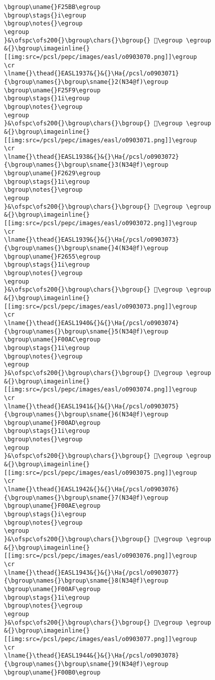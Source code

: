 \begin{verbatim}
\bgroup\uname{}F25BB\egroup
\bgroup\stags{}i\egroup
\bgroup\notes{}\egroup
\egroup
}&\ofspc\ofs200{}\bgroup\chars{}\bgroup{} 󲖻\egroup \egroup
&{}\bgroup\imageinline{}[[img:src=/pcsl/pepc/images/easl/o0903070.png]]\egroup
\cr
\lname{}\thead{}EASL1937&{}&{}\Ha{/pcsl/o0903071}{\bgroup\names{}\bgroup\sname{}2(N34@f)\egroup
\bgroup\uname{}F25F9\egroup
\bgroup\stags{}1i\egroup
\bgroup\notes{}\egroup
\egroup
}&\ofspc\ofs200{}\bgroup\chars{}\bgroup{} 󲗹\egroup \egroup
&{}\bgroup\imageinline{}[[img:src=/pcsl/pepc/images/easl/o0903071.png]]\egroup
\cr
\lname{}\thead{}EASL1938&{}&{}\Ha{/pcsl/o0903072}{\bgroup\names{}\bgroup\sname{}3(N34@f)\egroup
\bgroup\uname{}F2629\egroup
\bgroup\stags{}1i\egroup
\bgroup\notes{}\egroup
\egroup
}&\ofspc\ofs200{}\bgroup\chars{}\bgroup{} 󲘩\egroup \egroup
&{}\bgroup\imageinline{}[[img:src=/pcsl/pepc/images/easl/o0903072.png]]\egroup
\cr
\lname{}\thead{}EASL1939&{}&{}\Ha{/pcsl/o0903073}{\bgroup\names{}\bgroup\sname{}4(N34@f)\egroup
\bgroup\uname{}F2655\egroup
\bgroup\stags{}1i\egroup
\bgroup\notes{}\egroup
\egroup
}&\ofspc\ofs200{}\bgroup\chars{}\bgroup{} 󲙕\egroup \egroup
&{}\bgroup\imageinline{}[[img:src=/pcsl/pepc/images/easl/o0903073.png]]\egroup
\cr
\lname{}\thead{}EASL1940&{}&{}\Ha{/pcsl/o0903074}{\bgroup\names{}\bgroup\sname{}5(N34@f)\egroup
\bgroup\uname{}F00AC\egroup
\bgroup\stags{}1i\egroup
\bgroup\notes{}\egroup
\egroup
}&\ofspc\ofs200{}\bgroup\chars{}\bgroup{} 󰂬\egroup \egroup
&{}\bgroup\imageinline{}[[img:src=/pcsl/pepc/images/easl/o0903074.png]]\egroup
\cr
\lname{}\thead{}EASL1941&{}&{}\Ha{/pcsl/o0903075}{\bgroup\names{}\bgroup\sname{}6(N34@f)\egroup
\bgroup\uname{}F00AD\egroup
\bgroup\stags{}1i\egroup
\bgroup\notes{}\egroup
\egroup
}&\ofspc\ofs200{}\bgroup\chars{}\bgroup{} 󰂭\egroup \egroup
&{}\bgroup\imageinline{}[[img:src=/pcsl/pepc/images/easl/o0903075.png]]\egroup
\cr
\lname{}\thead{}EASL1942&{}&{}\Ha{/pcsl/o0903076}{\bgroup\names{}\bgroup\sname{}7(N34@f)\egroup
\bgroup\uname{}F00AE\egroup
\bgroup\stags{}i\egroup
\bgroup\notes{}\egroup
\egroup
}&\ofspc\ofs200{}\bgroup\chars{}\bgroup{} 󰂮\egroup \egroup
&{}\bgroup\imageinline{}[[img:src=/pcsl/pepc/images/easl/o0903076.png]]\egroup
\cr
\lname{}\thead{}EASL1943&{}&{}\Ha{/pcsl/o0903077}{\bgroup\names{}\bgroup\sname{}8(N34@f)\egroup
\bgroup\uname{}F00AF\egroup
\bgroup\stags{}1i\egroup
\bgroup\notes{}\egroup
\egroup
}&\ofspc\ofs200{}\bgroup\chars{}\bgroup{} 󰂯\egroup \egroup
&{}\bgroup\imageinline{}[[img:src=/pcsl/pepc/images/easl/o0903077.png]]\egroup
\cr
\lname{}\thead{}EASL1944&{}&{}\Ha{/pcsl/o0903078}{\bgroup\names{}\bgroup\sname{}9(N34@f)\egroup
\bgroup\uname{}F00B0\egroup

\end{verbatim}
